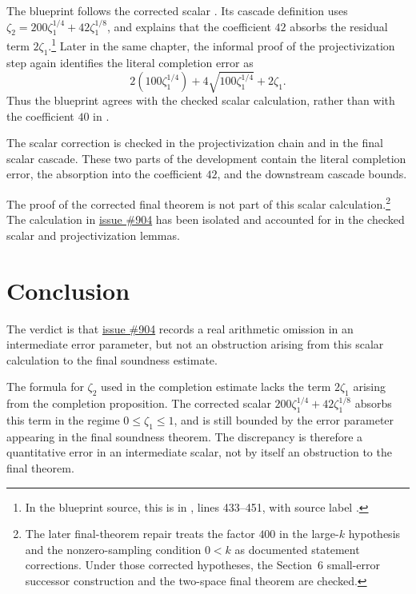 \documentclass[11pt]{article}
\begin{document}
The blueprint follows the corrected scalar
\cite[Chapter~\emph{The main induction step}]{MIPStarREBlueprint}.  Its cascade
definition uses
\(\zeta_2=200\zeta_1^{1/4}+42\zeta_1^{1/8}\), and explains that the coefficient
\(42\) absorbs the residual term \(2\zeta_1\).\footnote{In the blueprint source,
this is in , lines 433--451, with
source label .}
Later in the same chapter, the informal proof of the projectivization step again
identifies the literal completion error as
\[
  2(100\zeta_1^{1/4})+4\sqrt{100\zeta_1^{1/4}}+2\zeta_1.
\]
Thus the blueprint agrees with the checked scalar calculation, rather than with
the coefficient \(40\) in
\cite[Section~\emph{The main induction step}]{Ji2020LowIndividualDegree}.

The scalar correction is checked in the projectivization chain and in the final
scalar cascade.  These two parts of the development contain the literal
completion error, the absorption into the coefficient \(42\), and the downstream
cascade bounds.

The proof of the corrected final theorem is not part of this scalar
calculation.\footnote{The later final-theorem repair treats the factor \(400\)
in the large-\(k\) hypothesis and the nonzero-sampling condition \(0<k\) as
documented statement corrections.  Under those corrected hypotheses, the
Section~6 small-error successor construction and the two-space final theorem
are checked.}  The calculation in
\href{https://github.com/LionSR/MIPStarRE/issues/904}{issue \#904} has been
isolated and accounted for in the checked scalar and projectivization lemmas.

\section{Conclusion}

The verdict is that
\href{https://github.com/LionSR/MIPStarRE/issues/904}{issue \#904} records a
real arithmetic omission in an intermediate error parameter, but not an
obstruction arising from this scalar calculation to the final soundness estimate.

The formula for \(\zeta_2\) used in the completion estimate lacks the term
\(2\zeta_1\) arising from the completion proposition.  The corrected scalar
\(200\zeta_1^{1/4}+42\zeta_1^{1/8}\) absorbs this term in the regime
\(0\leq\zeta_1\leq 1\), and is still bounded by the error parameter appearing
in the final soundness theorem.  The discrepancy is therefore a quantitative
error in an intermediate scalar, not by itself an obstruction to the final
theorem.



\end{document}
